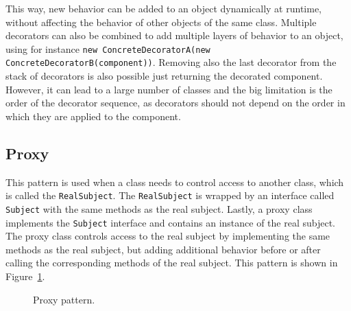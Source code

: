 This way, new behavior can be added to an object dynamically at runtime, without affecting the behavior of other objects of the same class. Multiple decorators can also be combined to add multiple layers of behavior to an object, using for instance \texttt{new ConcreteDecoratorA(new ConcreteDecoratorB(component))}. Removing also the last decorator from the stack of decorators is also possible just returning the decorated component. However, it can lead to a large number of classes and the big limitation is the order of the decorator sequence, as decorators should not depend on the order in which they are applied to the component.

\subsection{Proxy}

This pattern is used when a class needs to control access to another class, which is called the \texttt{RealSubject}. The \texttt{RealSubject} is wrapped by an interface called \texttt{Subject} with the same methods as the real subject. Lastly, a proxy class implements the \texttt{Subject} interface and contains an instance of the real subject. The proxy class controls access to the real subject by implementing the same methods as the real subject, but adding additional behavior before or after calling the corresponding methods of the real subject. This pattern is shown in Figure~\ref{fig:proxy}.
\begin{figure}
    \centering
    \caption{Proxy pattern.}
    \label{fig:proxy}
\end{figure}

